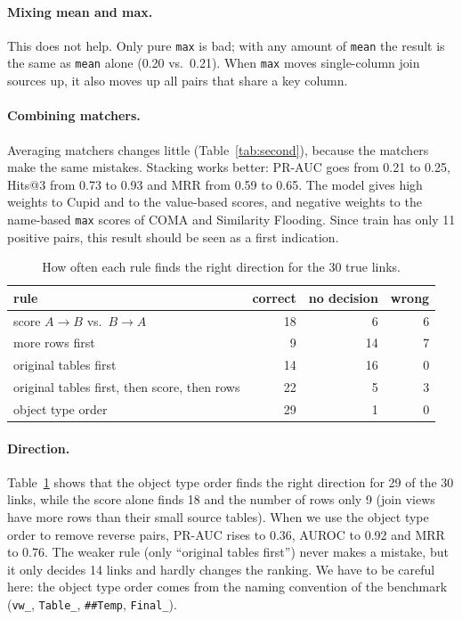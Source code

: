 \documentclass[11pt,a4paper]{article}
\begin{document}
\paragraph{Mixing mean and max.} This does not help. Only pure \texttt{max} is bad; with any amount of
\texttt{mean} the result is the same as \texttt{mean} alone (0.20 vs.\ 0.21). When \texttt{max} moves single-column
join sources up, it also moves up all pairs that share a key column.

\paragraph{Combining matchers.} Averaging matchers changes little (Table~\ref{tab:second}), because the matchers
make the same mistakes. Stacking works better: PR-AUC goes from 0.21 to 0.25, Hits@3 from 0.73 to 0.93 and MRR from
0.59 to 0.65. The model gives high weights to Cupid and to the value-based scores, and negative weights to the
name-based \texttt{max} scores of COMA and Similarity Flooding. Since train has only 11 positive pairs, this result
should be seen as a first indication.

\begin{table}[htbp]
\centering\small
\caption{How often each rule finds the right direction for the 30 true links.}
\label{tab:direction}
\begin{tabular}{lrrr}
\toprule
rule & correct & no decision & wrong \\
\midrule
score $A \rightarrow B$ vs.\ $B \rightarrow A$ & 18 & 6 & 6 \\
more rows first & 9 & 14 & 7 \\
original tables first & 14 & 16 & 0 \\
original tables first, then score, then rows & 22 & 5 & 3 \\
object type order & 29 & 1 & 0 \\
\bottomrule
\end{tabular}
\end{table}

\paragraph{Direction.} Table~\ref{tab:direction} shows that the object type order finds the right direction for
29 of the 30 links, while the score alone finds 18 and the number of rows only 9 (join views have more rows than
their small source tables). When we use the object type order to remove reverse pairs, PR-AUC rises to 0.36, AUROC
to 0.92 and MRR to 0.76. The weaker rule (only ``original tables first'') never makes a mistake, but it only decides
14 links and hardly changes the ranking. We have to be careful here: the object type order comes from the naming
convention of the benchmark (\texttt{vw\_}, \texttt{Table\_}, \texttt{\#\#Temp}, \texttt{Final\_}).
\end{document}
